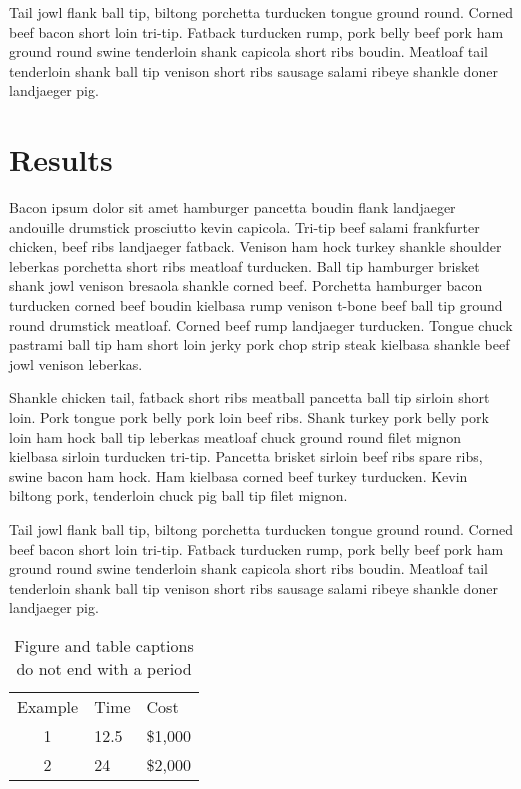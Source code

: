\documentclass[twocolumn,10pt]{asme2ej}
\begin{document}
Tail jowl flank ball tip, biltong porchetta turducken tongue ground round. Corned beef bacon short loin tri-tip. Fatback turducken rump, pork belly beef pork ham ground round swine tenderloin shank capicola short ribs boudin. Meatloaf tail tenderloin shank ball tip venison short ribs sausage salami ribeye shankle doner landjaeger pig.

\section{Results}

Bacon ipsum dolor sit amet hamburger pancetta boudin flank landjaeger andouille drumstick prosciutto kevin capicola. Tri-tip beef salami frankfurter chicken, beef ribs landjaeger fatback. Venison ham hock turkey shankle shoulder leberkas porchetta short ribs meatloaf turducken. Ball tip hamburger brisket shank jowl venison bresaola shankle corned beef. Porchetta hamburger bacon turducken corned beef boudin kielbasa rump venison t-bone beef ball tip ground round drumstick meatloaf. Corned beef rump landjaeger turducken. Tongue chuck pastrami ball tip ham short loin jerky pork chop strip steak kielbasa shankle beef jowl venison leberkas.

Shankle chicken tail, fatback short ribs meatball pancetta ball tip sirloin short loin. Pork tongue pork belly pork loin beef ribs. Shank turkey pork belly pork loin ham hock ball tip leberkas meatloaf chuck ground round filet mignon kielbasa sirloin turducken tri-tip. Pancetta brisket sirloin beef ribs spare ribs, swine bacon ham hock. Ham kielbasa corned beef turkey turducken. Kevin biltong pork, tenderloin chuck pig ball tip filet mignon.

Tail jowl flank ball tip, biltong porchetta turducken tongue ground round. Corned beef bacon short loin tri-tip. Fatback turducken rump, pork belly beef pork ham ground round swine tenderloin shank capicola short ribs boudin. Meatloaf tail tenderloin shank ball tip venison short ribs sausage salami ribeye shankle doner landjaeger pig.

\begin{table}[t]
\caption{Figure and table captions do not end with a period}
\begin{center}
\label{table_ASME}
\begin{tabular}{c l l}
& & \\ %
\hline
Example & Time & Cost \\
\hline
1 & 12.5 & \$1,000 \\
2 & 24 & \$2,000 \\
\hline
\end{tabular}
\end{center}
\end{table}
\end{document}
